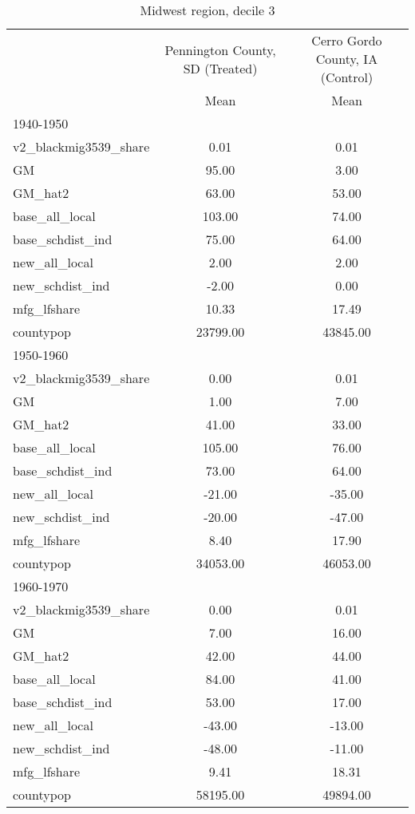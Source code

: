 \begin{table}[htbp]\centering
\def\sym#1{\ifmmode^{#1}\else\(^{#1}\)\fi}
\caption{Midwest region, decile 3 \label{tab1}}
\begin{tabular}{l*{2}{c}}
\toprule
                    &\multicolumn{1}{c}{Pennington County, SD (Treated)}&\multicolumn{1}{c}{Cerro Gordo County, IA (Control)}\\
                    &        Mean&        Mean\\
\midrule
1940-1950           &            &            \\
v2\_blackmig3539\_share&        0.01&        0.01\\
GM                  &       95.00&        3.00\\
GM\_hat2             &       63.00&       53.00\\
base\_all\_local      &      103.00&       74.00\\
base\_schdist\_ind    &       75.00&       64.00\\
new\_all\_local       &        2.00&        2.00\\
new\_schdist\_ind     &       -2.00&        0.00\\
mfg\_lfshare         &       10.33&       17.49\\
countypop           &    23799.00&    43845.00\\
\midrule
1950-1960           &            &            \\
v2\_blackmig3539\_share&        0.00&        0.01\\
GM                  &        1.00&        7.00\\
GM\_hat2             &       41.00&       33.00\\
base\_all\_local      &      105.00&       76.00\\
base\_schdist\_ind    &       73.00&       64.00\\
new\_all\_local       &      -21.00&      -35.00\\
new\_schdist\_ind     &      -20.00&      -47.00\\
mfg\_lfshare         &        8.40&       17.90\\
countypop           &    34053.00&    46053.00\\
\midrule
1960-1970           &            &            \\
v2\_blackmig3539\_share&        0.00&        0.01\\
GM                  &        7.00&       16.00\\
GM\_hat2             &       42.00&       44.00\\
base\_all\_local      &       84.00&       41.00\\
base\_schdist\_ind    &       53.00&       17.00\\
new\_all\_local       &      -43.00&      -13.00\\
new\_schdist\_ind     &      -48.00&      -11.00\\
mfg\_lfshare         &        9.41&       18.31\\
countypop           &    58195.00&    49894.00\\
\bottomrule
\end{tabular}
\end{table}
